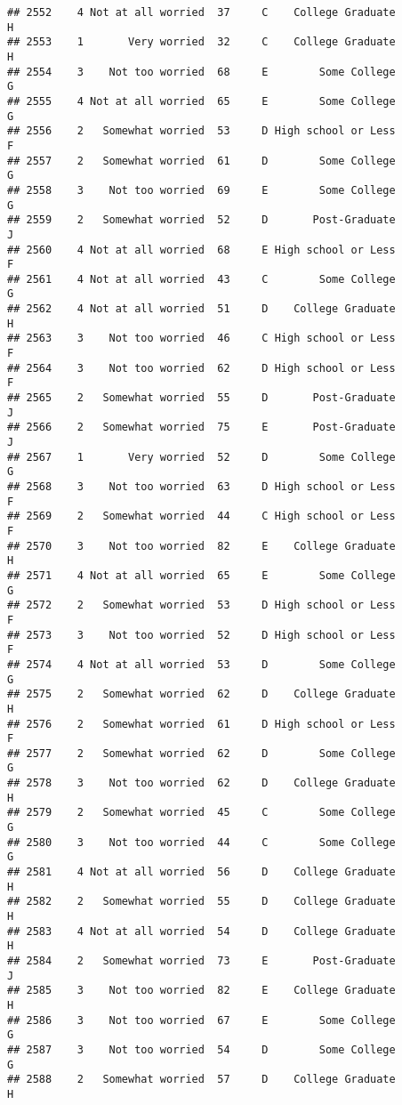 \documentclass[
]{article}
\begin{document}
\begin{verbatim}
## 2552    4 Not at all worried  37     C    College Graduate         H
## 2553    1       Very worried  32     C    College Graduate         H
## 2554    3    Not too worried  68     E        Some College         G
## 2555    4 Not at all worried  65     E        Some College         G
## 2556    2   Somewhat worried  53     D High school or Less         F
## 2557    2   Somewhat worried  61     D        Some College         G
## 2558    3    Not too worried  69     E        Some College         G
## 2559    2   Somewhat worried  52     D       Post-Graduate         J
## 2560    4 Not at all worried  68     E High school or Less         F
## 2561    4 Not at all worried  43     C        Some College         G
## 2562    4 Not at all worried  51     D    College Graduate         H
## 2563    3    Not too worried  46     C High school or Less         F
## 2564    3    Not too worried  62     D High school or Less         F
## 2565    2   Somewhat worried  55     D       Post-Graduate         J
## 2566    2   Somewhat worried  75     E       Post-Graduate         J
## 2567    1       Very worried  52     D        Some College         G
## 2568    3    Not too worried  63     D High school or Less         F
## 2569    2   Somewhat worried  44     C High school or Less         F
## 2570    3    Not too worried  82     E    College Graduate         H
## 2571    4 Not at all worried  65     E        Some College         G
## 2572    2   Somewhat worried  53     D High school or Less         F
## 2573    3    Not too worried  52     D High school or Less         F
## 2574    4 Not at all worried  53     D        Some College         G
## 2575    2   Somewhat worried  62     D    College Graduate         H
## 2576    2   Somewhat worried  61     D High school or Less         F
## 2577    2   Somewhat worried  62     D        Some College         G
## 2578    3    Not too worried  62     D    College Graduate         H
## 2579    2   Somewhat worried  45     C        Some College         G
## 2580    3    Not too worried  44     C        Some College         G
## 2581    4 Not at all worried  56     D    College Graduate         H
## 2582    2   Somewhat worried  55     D    College Graduate         H
## 2583    4 Not at all worried  54     D    College Graduate         H
## 2584    2   Somewhat worried  73     E       Post-Graduate         J
## 2585    3    Not too worried  82     E    College Graduate         H
## 2586    3    Not too worried  67     E        Some College         G
## 2587    3    Not too worried  54     D        Some College         G
## 2588    2   Somewhat worried  57     D    College Graduate         H

\end{verbatim}
\end{document}
